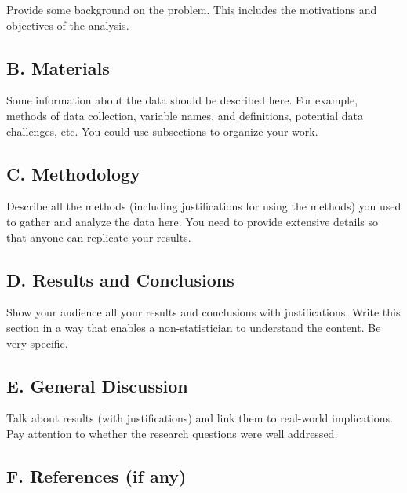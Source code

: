 \documentclass[
]{book}
\begin{document}
Provide some background on the problem. This includes the motivations and objectives of the analysis.

\hypertarget{b.-materials}{%
\subsection*{B. Materials}\label{b.-materials}}

Some information about the data should be described here. For example, methods of data collection, variable names, and definitions, potential data challenges, etc. You could use subsections to organize your work.

\hypertarget{c.-methodology}{%
\subsection*{C. Methodology}\label{c.-methodology}}

Describe all the methods (including justifications for using the methods) you used to gather and analyze the data here. You need to provide extensive details so that anyone can replicate your results.

\hypertarget{d.-results-and-conclusions}{%
\subsection*{D. Results and Conclusions}\label{d.-results-and-conclusions}}

Show your audience all your results and conclusions with justifications. Write this section in a way that enables a non-statistician to understand the content. Be very specific.

\hypertarget{e.-general-discussion}{%
\subsection*{E. General Discussion}\label{e.-general-discussion}}

Talk about results (with justifications) and link them to real-world implications. Pay attention to whether the research questions were well addressed.

\hypertarget{f.-references-if-any}{%
\subsection*{F. References (if any)}\label{f.-references-if-any}}
\end{document}
